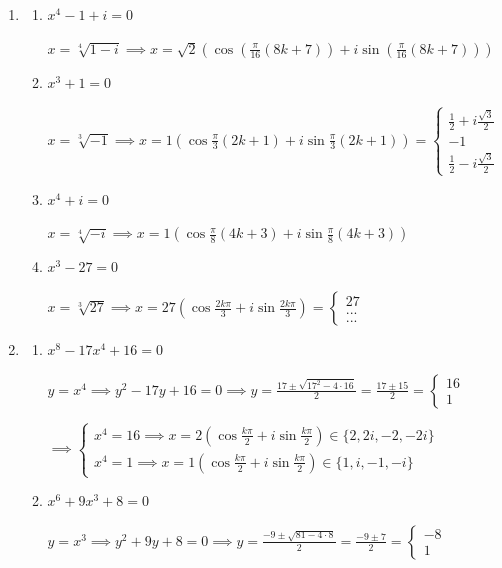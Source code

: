 \documentclass[12pt, openright, a4paper, twoside, english, brazil]{article}
\newenvironment{qmitem}{
  \color{black}
\item
\begin{enumerate}[\bfseries a)]}{
\end{enumerate}\vspace{10pt}}
\newcommand{\cis}[1]{\displaystyle(\cos#1+i\sin#1)}
\begin{document}
\begin{enumerate}[\bfseries 1.]
\begin{qmitem}
\color{black}
\item $x^4-1+i=0$
\color{red}

$\displaystyle x=\sqrt[4]{1-i}\implies
x=\sqrt2\cis{\left(\frac{\pi}{16}(8k+7)\right)}$

\color{black}
\item $x^3+1=0$
\color{red}

$\displaystyle x=\sqrt[3]{-1}\implies x=1\cis{\frac{\pi}{3}(2k+1)}=
\begin{cases}\frac12+i\frac{\sqrt3}{2}\\-1\\\frac12-i\frac{\sqrt{3}}{2}
\end{cases}$

\color{black}
\item $x^4+i=0$
\color{red}

$\displaystyle x=\sqrt[4]{-i}\implies x=1\cis{\frac{\pi}{8}(4k+3)}$

\color{black}
\item $x^3-27=0$
\color{red}

$\displaystyle x=\sqrt[3]{27}\implies x=27\cis{\frac{2k\pi}{3}}=
\begin{cases}27\\...\\...
\end{cases}$

\end{qmitem}

\begin{qmitem} %
\item $x^8-17x^4+16=0$
\color{red}

$\displaystyle y=x^4\implies y^2-17y+16=0\implies
y=\frac{17\pm\sqrt{17^2-4\cdot
16}}{2}=\frac{17\pm15}{2}=
\begin{cases}16\\1
\end{cases}$

$\implies
\begin{cases}x^4=16\implies
  x=2\cis{\frac{k\pi}{2}}\in\{2,2i,-2,-2i\}\\x^4=1\implies
  x=1\cis{\frac{k\pi}{2}}\in\{1,i,-1,-i\}
\end{cases}$

\color{black}
\item $x^6+9x^3+8=0$
\color{red}

$\displaystyle y=x^3\implies y^2+9y+8=0\implies y=\frac{-9\pm\sqrt{81-4\cdot
8}}{2}=\frac{-9\pm7}{2}=
\begin{cases}-8\\1
\end{cases}$


\end{qmitem}
\end{enumerate}
\end{document}
